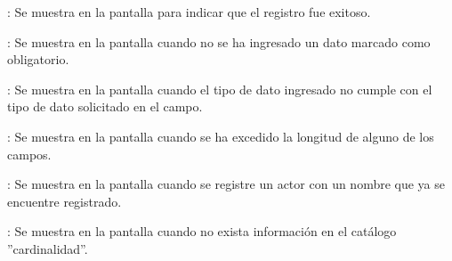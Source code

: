 \begin{Citemize}
	\item {}: Se muestra en la pantalla  para indicar que el registro fue exitoso.
	\item {}: Se muestra en la pantalla  cuando no se ha ingresado un dato marcado como obligatorio.
	\item {}: Se muestra en la pantalla  cuando el tipo de dato ingresado no cumple con el tipo de dato solicitado en el campo.
	\item {}: Se muestra en la pantalla  cuando se ha excedido la longitud de alguno de los campos.
	\item {}: Se muestra en la pantalla  cuando se registre un actor con un nombre que ya se encuentre registrado.
	\item {}: Se muestra en la pantalla  cuando no exista información en el catálogo ''cardinalidad''.
\end{Citemize}
